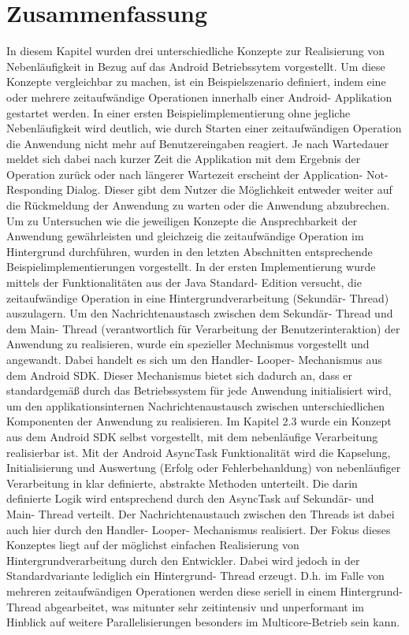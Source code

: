 \documentclass[12pt,oneside,a4paper,bibtotoc,liststotoc]{scrreprt}
\begin{document}
\section{Zusammenfassung}
In diesem Kapitel wurden drei unterschiedliche Konzepte zur Realisierung von Nebenläufigkeit in Bezug auf das Android Betriebssytem vorgestellt. Um diese Konzepte vergleichbar zu machen, ist ein Beispielszenario definiert, indem eine oder mehrere zeitaufwändige Operationen innerhalb einer Android- Applikation gestartet werden. In einer ersten Beispielimplementierung ohne jegliche Nebenläufigkeit wird deutlich, wie durch Starten einer zeitaufwändigen Operation die Anwendung nicht mehr auf Benutzereingaben reagiert. Je nach Wartedauer meldet sich dabei nach kurzer Zeit die Applikation mit dem Ergebnis der Operation zurück oder nach längerer Wartezeit erscheint der Application- Not- Responding Dialog. Dieser gibt dem Nutzer die Möglichkeit entweder weiter auf die Rückmeldung der Anwendung zu warten oder die Anwendung abzubrechen. Um zu Untersuchen wie die jeweiligen Konzepte die Ansprechbarkeit der Anwendung gewährleisten und gleichzeig die zeitaufwändige Operation im Hintergrund durchführen, wurden in den letzten Abschnitten entsprechende Beispielimplementierungen  vorgestellt.\newline
In der ersten Implementierung wurde mittels der Funktionalitäten aus der Java Standard- Edition versucht, die zeitaufwändige Operation in eine Hintergrundverarbeitung (Sekundär- Thread) auszulagern. Um den Nachrichtenaustasch zwischen dem Sekundär- Thread und dem Main- Thread (verantwortlich für Verarbeitung der Benutzerinteraktion) der Anwendung zu realisieren, wurde ein spezieller Mechnismus vorgestellt und angewandt. Dabei handelt es sich um den Handler- Looper- Mechanismus aus dem Android SDK. Dieser Mechanismus bietet sich dadurch an, dass er standardgemäß durch das Betriebssystem für jede Anwendung initialisiert wird, um den applikationsinternen Nachrichtenaustausch zwischen unterschiedlichen Komponenten der Anwendung zu realisieren.\newline
Im Kapitel 2.3 wurde ein Konzept aus dem Android SDK selbst vorgestellt, mit dem nebenläufige Verarbeitung realisierbar ist. Mit der Android AsyncTask Funktionalität wird die Kapselung, Initialisierung und Auswertung (Erfolg oder Fehlerbehanldung) von nebenläufiger Verarbeitung in klar definierte, abstrakte Methoden unterteilt. Die darin definierte Logik wird entsprechend durch den AsyncTask auf Sekundär- und Main- Thread verteilt. Der Nachrichtenaustauch zwischen den Threads ist dabei auch hier durch den Handler- Looper- Mechanismus realisiert. Der Fokus dieses Konzeptes liegt auf der möglichst einfachen Realisierung von Hintergrundverarbeitung durch den Entwickler. Dabei wird jedoch in der Standardvariante lediglich ein Hintergrund- Thread erzeugt. D.h. im Falle von mehreren zeitaufwändigen Operationen werden diese seriell in einem Hintergrund- Thread abgearbeitet, was mitunter sehr zeitintensiv und unperformant im Hinblick auf weitere Parallelisierungen besonders im Multicore-Betrieb sein kann. \newline
\end{document}
